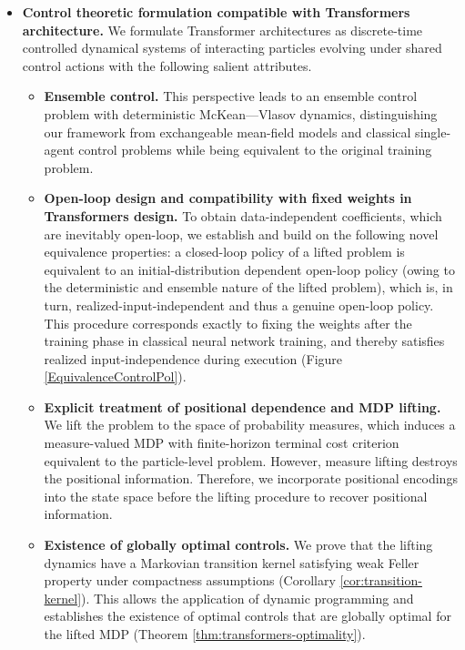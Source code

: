 \documentclass[11pt]{article}
\begin{document}
\begin{itemize}
    \item[(i)] \textbf{Control theoretic formulation compatible with Transformers architecture.} We formulate Transformer architectures as discrete-time controlled dynamical systems of interacting particles evolving under shared control actions with the following salient attributes. 
    \begin{itemize}
    \item \textbf{Ensemble control.} This perspective leads to an ensemble control problem with deterministic McKean---Vlasov dynamics, distinguishing our framework from exchangeable mean-field models and classical single-agent control problems while being equivalent to the original training problem.
\item \textbf{Open-loop design and compatibility with fixed weights in Transformers design.}
    To obtain data-independent coefficients, which are inevitably open-loop, we establish and build on the following novel equivalence properties: a closed-loop policy of a lifted problem is equivalent to an initial-distribution dependent open-loop policy (owing to the deterministic and ensemble nature of the lifted problem), which is, in turn, realized-input-independent and thus a genuine open-loop policy. This procedure corresponds exactly to fixing the weights after the training phase in classical neural network training, and thereby satisfies realized input-independence during execution (Figure \ref{EquivalenceControlPol}). %
    
    \item \textbf{Explicit treatment of positional dependence and MDP lifting.} We lift the problem to the space of probability measures, which induces a measure-valued MDP with finite-horizon terminal cost criterion equivalent to the particle-level problem. However, measure lifting destroys the positional information. Therefore, we incorporate positional encodings into the state space before the lifting procedure to recover positional information.
    
     \item \textbf{Existence of globally optimal controls.} We prove that the lifting dynamics have a Markovian transition kernel satisfying weak Feller property under compactness assumptions (Corollary \ref{cor:transition-kernel}). This allows the application of dynamic programming and establishes the existence of optimal controls that are globally optimal for the lifted MDP (Theorem \ref{thm:transformers-optimality}).
    \end{itemize}


\end{itemize}
\end{document}
